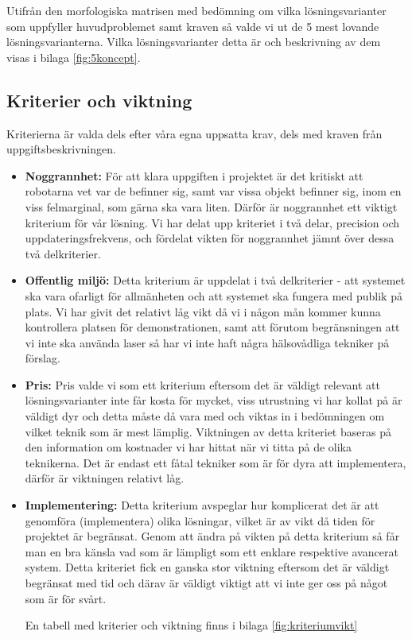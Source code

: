 \documentclass[11pt, a4paper]{report}
\begin{document}
Utifrån den morfologiska matrisen med bedömning om vilka lösningsvarianter som uppfyller huvudproblemet samt kraven så valde vi ut de 5 mest lovande lösningsvarianterna. Vilka lösningsvarianter detta är och beskrivning av dem visas i bilaga \ref{fig:5koncept}.


\subsection{Kriterier och viktning}

Kriterierna är valda dels efter våra egna uppsatta krav, dels med kraven från uppgiftsbeskrivningen. 
\begin{itemize}
\item \textbf{Noggrannhet:}
För att klara uppgiften i projektet är det kritiskt att robotarna vet var de befinner sig, samt var vissa objekt befinner sig, inom en viss felmarginal, som gärna ska vara liten. Därför är noggrannhet ett viktigt kriterium för vår lösning. Vi har delat upp kriteriet i två delar, precision och uppdateringsfrekvens, och fördelat vikten för noggrannhet jämnt över dessa två delkriterier.

\item \textbf{Offentlig miljö:}
Detta kriterium är uppdelat i två delkriterier - att systemet ska vara ofarligt för allmänheten och att systemet ska fungera med publik på plats. Vi har givit det relativt låg vikt då vi i någon mån kommer kunna kontrollera platsen för demonstrationen, samt att förutom begränsningen att vi inte ska använda laser så har vi inte haft några hälsovådliga tekniker på förslag.

\item \textbf{Pris:}
Pris valde vi som ett kriterium eftersom det är väldigt relevant att lösningsvarianter inte får kosta för mycket, viss utrustning vi har kollat på är väldigt dyr och detta måste då vara med och viktas in i bedömningen om vilket teknik som är mest lämplig. Viktningen av detta kriteriet baseras på den information om kostnader vi har hittat när vi titta på de olika teknikerna. Det är endast ett fåtal tekniker som är för dyra att implementera, därför är viktningen relativt låg.

\item \textbf{Implementering:}
Detta kriterium avspeglar hur komplicerat det är att genomföra (implementera) olika lösningar, vilket är av vikt då tiden för projektet är begränsat.
Genom att ändra på vikten på detta kriterium så får man en bra känsla vad som är lämpligt som ett enklare respektive avancerat system. Detta kriteriet fick en ganska stor viktning eftersom det är väldigt begränsat med tid och därav är väldigt viktigt att vi inte ger oss på något som är för svårt.

En tabell med kriterier och viktning finns i bilaga \ref{fig:kriteriumvikt}

\end{itemize}
\end{document}
